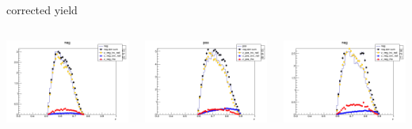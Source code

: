 \begin{frame}{corrected yield}
\begin{columns}
\begin{column}[T]{0.25\textwidth}
\includegraphics[width = \textwidth]{results/yield/statistics_corr/yield_x_Q2_z_0.50_5.500_0.60_neg.png}
\end{column}
\begin{column}[T]{0.25\textwidth}
\includegraphics[width = \textwidth]{results/yield/statistics_corr/yield_x_Q2_z_0.50_5.500_0.70_pos.png}
\end{column}
\begin{column}[T]{0.25\textwidth}
\includegraphics[width = \textwidth]{results/yield/statistics_corr/yield_x_Q2_z_0.50_5.500_0.70_neg.png}
\end{column}
\end{columns}
\end{frame}
